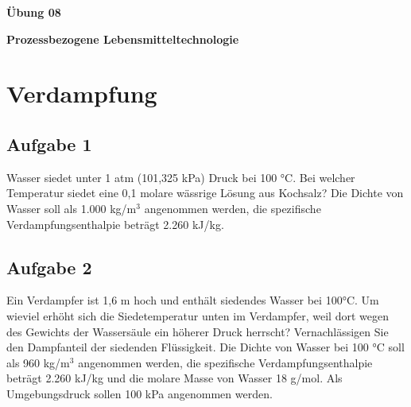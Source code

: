 \documentclass[a4paper,11pt]{article}
\newif\ifshowme
\begin{document}

\bckgrnd

\begin{center}
\LARGE
\color{white}
\textbf{Übung 08} \par \vspace*{2mm}
\large \color{miugray} \textbf{Prozessbezogene Lebensmitteltechnologie}
\end{center}
\par 
\vspace*{6mm}


\color{miudiutex}
\section*{Verdampfung}

\subsection*{Aufgabe 1}
Wasser siedet unter 1 atm (101,325 kPa) Druck bei 100 °C. Bei welcher Temperatur siedet
eine 0,1 molare wässrige Lösung aus Kochsalz? Die Dichte von Wasser soll als 1.000 kg/m$^3$ angenommen werden, die spezifische Verdampfungsenthalpie beträgt 2.260 kJ/kg. 

\pp
\ifshowme
\antwort{

Formel zur Bearbeitung der Aufgabe:
\begin{align*}
\Delta T \approx \frac{R \cdot T_L^2}{\rho_L \cdot \Delta h_v} \cdot c_i
\end{align*}
Werte einsetzen:
\begin{align*}
\Delta T &\approx \frac{8,314 ~\text{J / K mol} \cdot (373,15 ~\text{K})^2}{1.000 ~\text{kg/m$^3$} \cdot 2,26 \cdot 10^6 ~\text{J/kg}} \cdot 0,2 \cdot 10^{3}~\text{mol/m}^3 \\
&\approx 0,1 ~\text{K}
\end{align*}
}
\else
\fi

\subsection*{Aufgabe 2}
Ein Verdampfer ist 1,6 m hoch und enthält siedendes Wasser bei 100°C. Um wieviel erhöht
sich die Siedetemperatur unten im Verdampfer, weil dort wegen des Gewichts der
Wassersäule ein höherer Druck herrscht? Vernachlässigen Sie den Dampfanteil der
siedenden Flüssigkeit. Die Dichte von Wasser bei 100 °C soll als 960 kg/m$^3$
 angenommen werden, die spezifische Verdampfungsenthalpie beträgt 2.260 kJ/kg und die molare Masse
von Wasser 18 g/mol. Als Umgebungsdruck sollen 100 kPa angenommen werden. 
\end{document}
